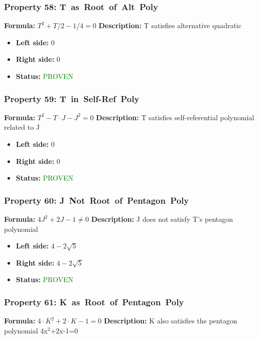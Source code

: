 \subsubsection*{Property 58: T~as~Root~of~Alt~Poly}
\textbf{Formula:} $T^2 + T/2 - 1/4 = 0$
\textbf{Description:} T satisfies alternative quadratic

\begin{itemize}
\item \textbf{Left side:} $0$
\item \textbf{Right side:} $0$
\item \textbf{Status:} \textcolor{green}{PROVEN}
\end{itemize}

\subsubsection*{Property 59: T~in~Self-Ref~Poly}
\textbf{Formula:} $T^2 - T \cdot J - J^2 = 0$
\textbf{Description:} T satisfies self-referential polynomial related to J

\begin{itemize}
\item \textbf{Left side:} $0$
\item \textbf{Right side:} $0$
\item \textbf{Status:} \textcolor{green}{PROVEN}
\end{itemize}

\subsubsection*{Property 60: J~Not~Root~of~Pentagon~Poly}
\textbf{Formula:} $4J^2 + 2J - 1  \neq  0$
\textbf{Description:} J does not satisfy T's pentagon polynomial

\begin{itemize}
\item \textbf{Left side:} $4 - 2 \sqrt{5}$
\item \textbf{Right side:} $4 - 2 \sqrt{5}$
\item \textbf{Status:} \textcolor{green}{PROVEN}
\end{itemize}

\subsubsection*{Property 61: K~as~Root~of~Pentagon~Poly}
\textbf{Formula:} $4 \cdot K^2 + 2 \cdot K - 1 = 0$
\textbf{Description:} K also satisfies the pentagon polynomial 4x$^2$+2x-1=0

